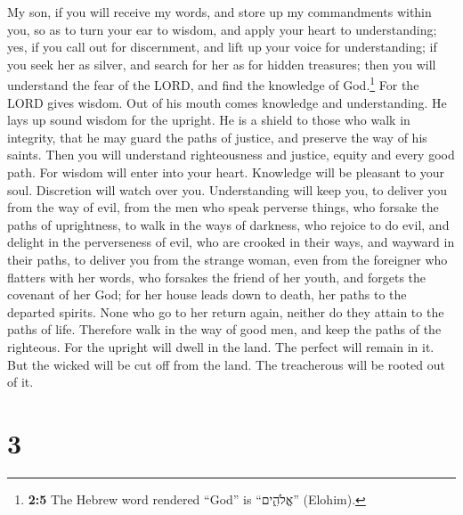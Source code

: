  My son, if you will receive my words, and store up my
commandments within you,  so as to turn your ear to
wisdom, and apply your heart to understanding;  yes, if
you call out for discernment, and lift up your voice for understanding;
 if you seek her as silver, and search for her as for
hidden treasures;  then you will understand the fear of
the LORD, and find the knowledge of God.\footnote{\textbf{2:5} The
  Hebrew word rendered ``God'' is ``אֱלֹהִ֑ים'' (Elohim).}
 For the LORD gives wisdom. Out of his mouth comes
knowledge and understanding.  He lays up sound wisdom for
the upright. He is a shield to those who walk in integrity,
 that he may guard the paths of justice, and preserve the
way of his saints.  Then you will understand righteousness
and justice, equity and every good path.  For wisdom will
enter into your heart. Knowledge will be pleasant to your soul.
 Discretion will watch over you. Understanding will keep
you,  to deliver you from the way of evil, from the men
who speak perverse things,  who forsake the paths of
uprightness, to walk in the ways of darkness,  who
rejoice to do evil, and delight in the perverseness of evil,
 who are crooked in their ways, and wayward in their
paths,  to deliver you from the strange woman, even from
the foreigner who flatters with her words,  who forsakes
the friend of her youth, and forgets the covenant of her God;
 for her house leads down to death, her paths to the
departed spirits.  None who go to her return again,
neither do they attain to the paths of life.  Therefore
walk in the way of good men, and keep the paths of the righteous.
 For the upright will dwell in the land. The perfect will
remain in it.  But the wicked will be cut off from the
land. The treacherous will be rooted out of it.

\hypertarget{section-2}{%
\section{3}\label{section-2}}

